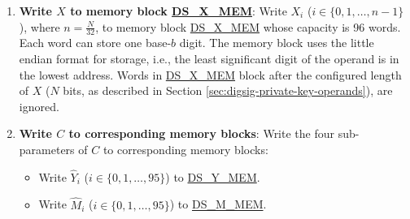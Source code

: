 \documentclass[main\_\_EN.tex]{subfiles}
\begin{document}
\begin{enumerate}
    \item {\bfseries Write \begin{math}X\end{math} to memory block \hyperref[DSXMEM]{DS\_X\_MEM}}: Write \begin{math}X_{i}\end{math}
        (\begin{math}i \in \{ 0, 1, \dots, n-1 \} \end{math}), where \begin{math} n = \frac{N}{32} \end{math}, to memory block \hyperref[DSXMEM]{DS\_X\_MEM} whose capacity is 96 words. Each word can store one base-\begin{math}b\end{math} digit. The memory block uses the little endian format for storage, i.e., the least significant digit of the operand is in the lowest address. Words in \hyperref[DSXMEM]{DS\_X\_MEM} block after the configured length of \begin{math}X\end{math} (\begin{math}N\end{math} bits, as described in Section \ref{sec:digsig-private-key-operands}), are ignored.
        
    \item {\bfseries Write \begin{math}C\end{math} to corresponding memory blocks}: Write the four sub-parameters of \begin{math}C\end{math} to corresponding memory blocks:
    \begin{itemize}
        \item Write \begin{math}\widehat{Y}_{i}\end{math}
        (\begin{math}i \in \{ 0, 1, \dots, 95 \} \end{math})
        to \hyperref[DSYMEM]{DS\_Y\_MEM}.
        
        \item Write \begin{math}\widehat{M}_{i}\end{math}
        (\begin{math}i \in \{ 0, 1, \dots, 95 \} \end{math})
        to \hyperref[DSMMEM]{DS\_M\_MEM}.
        

\end{itemize}
\end{enumerate}
\end{document}
